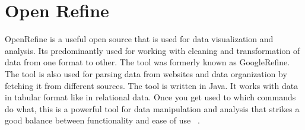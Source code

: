 \section{Open Refine}

OpenRefine is a useful open source that is used for data visualization and analysis. 
Its predominantly used for working with cleaning and transformation of data from one format to other.
The tool was formerly known as GoogleRefine. The tool is also used for parsing data from websites and data organization
by fetching it from different sources. The tool is written in Java. It works with data in tabular format like in relational data.
Once you get used to which commands do what, this is a powerful tool for data manipulation and analysis
that strikes a good balance between functionality and ease of use ~\cite{hid-sp18-417-openrefine}.

